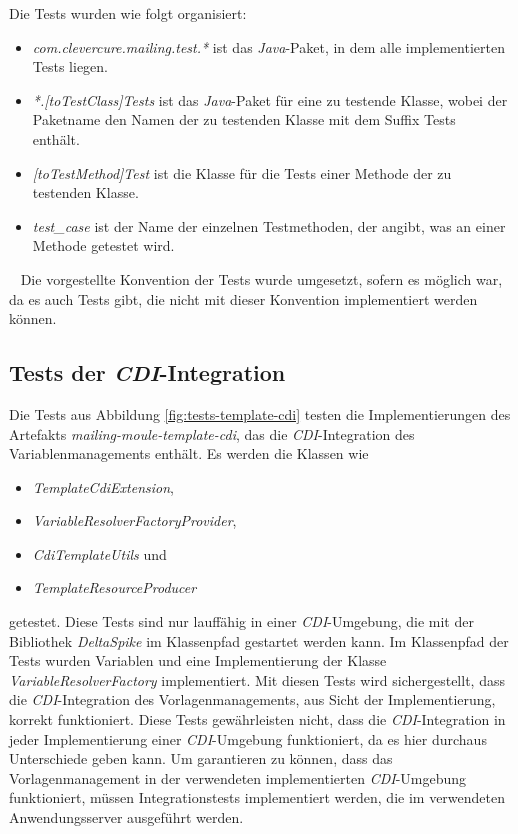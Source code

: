 \newline
\newline
Die Tests wurden wie folgt organisiert:
\begin{itemize}
	\item\emph{com.clevercure.mailing.test.*} ist das \emph{Java}-Paket, in dem alle implementierten Tests liegen. 
	\item\emph{*.[toTestClass]Tests} ist das \emph{Java}-Paket für eine zu testende Klasse, wobei der Paketname den Namen der zu testenden Klasse mit dem Suffix \grqq Tests\grqq ~ enthält.
	\item\emph{[toTestMethod]Test} ist die Klasse für die Tests einer Methode der zu testenden Klasse.
	\item\emph{test\_case} ist der Name der einzelnen Testmethoden, der angibt, was an einer Methode getestet wird. 
\end{itemize}
\ \newline
Die vorgestellte Konvention der Tests wurde umgesetzt, sofern es möglich war, da es auch Tests gibt, die nicht mit dieser Konvention implementiert werden können.

\subsection{Tests der \emph{CDI}-Integration}
Die Tests aus Abbildung \ref{fig:tests-template-cdi} testen die Implementierungen des Artefakts \emph{mailing-moule-template-cdi}, das die \emph{CDI}-Integration des Variablenmanagements enthält. Es werden die Klassen wie
\begin{itemize}
	\item \emph{TemplateCdiExtension},
	\item \emph{VariableResolverFactoryProvider},
	\item \emph{CdiTemplateUtils} und 
	\item \emph{TemplateResourceProducer}
\end{itemize}
getestet.
\newline
\newline
Diese Tests sind nur lauffähig in einer \emph{CDI}-Umgebung, die mit der Bibliothek \emph{DeltaSpike} im Klassenpfad gestartet werden kann. Im Klassenpfad der Tests wurden Variablen und eine Implementierung der Klasse \emph{VariableResolverFactory} implementiert. Mit diesen Tests wird sichergestellt, dass die \emph{CDI}-Integration des Vorlagenmanagements, aus Sicht der Implementierung, korrekt funktioniert. Diese Tests gewährleisten nicht, dass die \emph{CDI}-Integration in jeder Implementierung einer \emph{CDI}-Umgebung funktioniert, da es hier durchaus Unterschiede geben kann. Um garantieren zu können, dass das Vorlagenmanagement in der verwendeten implementierten \emph{CDI}-Umgebung funktioniert, müssen Integrationstests implementiert werden, die im verwendeten Anwendungsserver ausgeführt werden.
\newpage

